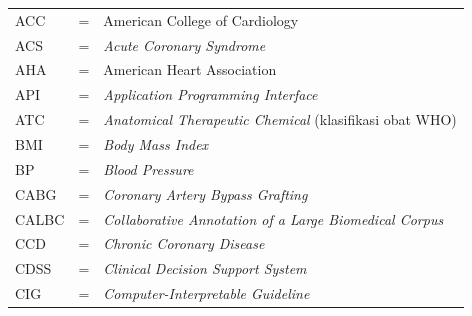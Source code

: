 
\begin{longtable}{llp{3.6in}}
	ACC     & \hspace{1cm} = & American College of Cardiology \\
	ACS     & \hspace{1cm} = & \emph{Acute Coronary Syndrome} \\
	AHA     & \hspace{1cm} = & American Heart Association \\
	API     & \hspace{1cm} = & \emph{Application Programming Interface} \\
	ATC     & \hspace{1cm} = & \emph{Anatomical Therapeutic Chemical} (klasifikasi obat WHO) \\
	BMI     & \hspace{1cm} = & \emph{Body Mass Index} \\
	BP      & \hspace{1cm} = & \emph{Blood Pressure} \\
	CABG    & \hspace{1cm} = & \emph{Coronary Artery Bypass Grafting} \\
	CALBC   & \hspace{1cm} = & \emph{Collaborative Annotation of a Large Biomedical Corpus} \\
	CCD     & \hspace{1cm} = & \emph{Chronic Coronary Disease} \\
	CDSS    & \hspace{1cm} = & \emph{Clinical Decision Support System} \\
	CIG     & \hspace{1cm} = & \emph{Computer-Interpretable Guideline} \\

\end{longtable}
